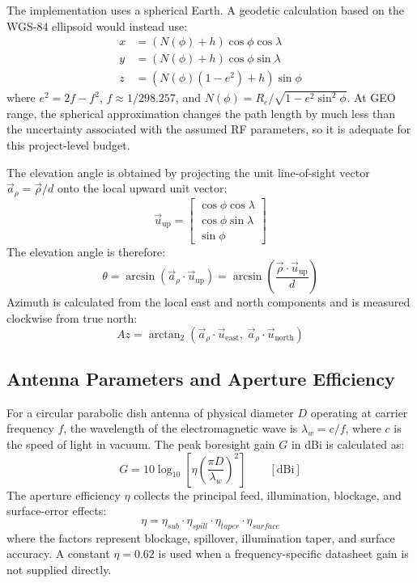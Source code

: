 The implementation uses a spherical Earth. A geodetic calculation based on the WGS-84 ellipsoid would instead use:
\begin{align}
    x &= (N(\phi) + h)\cos\phi\cos\lambda \\
    y &= (N(\phi) + h)\cos\phi\sin\lambda \\
    z &= (N(\phi)(1-e^2) + h)\sin\phi
\end{align}
where $e^2 = 2f - f^2$, $f \approx 1/298.257$, and $N(\phi) = R_e / \sqrt{1 - e^2\sin^2\phi}$. At GEO range, the spherical approximation changes the path length by much less than the uncertainty associated with the assumed RF parameters, so it is adequate for this project-level budget.

The elevation angle is obtained by projecting the unit line-of-sight vector $\vec{a}_{\rho} = \vec{\rho}/d$ onto the local upward unit vector:
\begin{equation}
    \vec{u}_{\mathrm{up}} = \begin{bmatrix} \cos\phi\cos\lambda \\ \cos\phi\sin\lambda \\ \sin\phi \end{bmatrix}
\end{equation}
The elevation angle is therefore:
\begin{equation}
    \theta = \arcsin\left( \vec{a}_{\rho} \cdot \vec{u}_{\mathrm{up}} \right) = \arcsin\left( \frac{\vec{\rho} \cdot \vec{u}_{\mathrm{up}}}{d} \right)
\end{equation}
Azimuth is calculated from the local east and north components and is measured clockwise from true north:
\begin{equation}
    Az = \arctan_2\left( \vec{a}_{\rho} \cdot \vec{u}_{\mathrm{east}},\ \vec{a}_{\rho} \cdot \vec{u}_{\mathrm{north}} \right)
\end{equation}

\subsection{Antenna Parameters and Aperture Efficiency}
For a circular parabolic dish antenna of physical diameter $D$ operating at carrier frequency $f$, the wavelength of the electromagnetic wave is $\lambda_w = c/f$, where $c$ is the speed of light in vacuum. The peak boresight gain $G$ in dBi is calculated as:
\begin{equation}
    G
    =
    10\log_{10}\left[\eta\left(\frac{\pi D}{\lambda_w}\right)^2\right]
    \qquad [\mathrm{dBi}]
\end{equation}
The aperture efficiency $\eta$ collects the principal feed, illumination, blockage, and surface-error effects:
\begin{equation}
    \eta = \eta_{sub} \cdot \eta_{spill} \cdot \eta_{taper} \cdot \eta_{surface}
\end{equation}
where the factors represent blockage, spillover, illumination taper, and surface accuracy. A constant $\eta = 0.62$ is used when a frequency-specific datasheet gain is not supplied directly.

